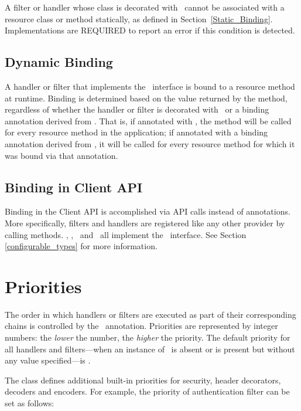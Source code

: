 A filter or handler whose class is decorated with \GlobalBinding\ cannot be associated with a resource class or method statically, as defined in Section~\ref{Static_Binding}. Implementations are REQUIRED to report an error if this condition is detected.

\subsection{Dynamic Binding}

A handler or filter that implements the \DynamicBinding\ interface is bound to a resource method at runtime. Binding is determined based on the value returned by the  method, regardless of whether the handler or filter is decorated with \GlobalBinding\ or a binding annotation derived from \NameBinding. That is, if annotated with \GlobalBinding, the  method will be called for every resource method in the application; if annotated with a binding annotation derived from \NameBinding, it will be called for every resource method for which it was bound via that annotation.

\subsection{Binding in Client API}
\label{binding_in_client_api}

Binding in the Client API is accomplished via API calls instead of annotations. More specifically, filters and handlers are registered like any other provider by calling  methods. \Client, \ClientConfiguration, \Link\ and \Invocation\ all implement the \Configurable\ interface. See Section \ref{configurable_types} for more information.

\section{Priorities}
\label{priorities}

The order in which handlers or filters are executed as part of their corresponding chains is controlled by the \BindingPriority\ annotation.
Priorities are represented by integer numbers: the \emph{lower} the number, the \emph{higher} the priority. The default priority for all handlers and filters---when an instance of \BindingPriority\ is absent or is present but without any value specified---is . 

The  class defines additional built-in priorities for security, header decorators, decoders and encoders. For example, the priority of authentication filter can be set as follows:

